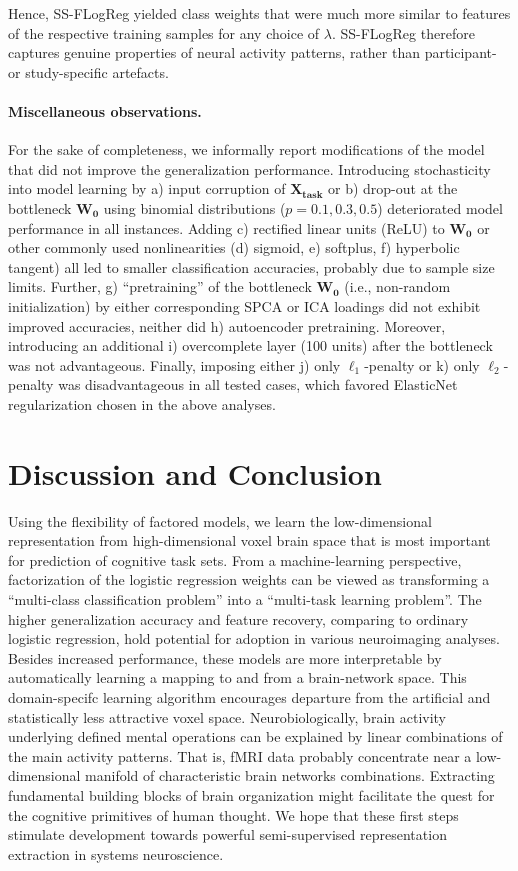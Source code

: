 \documentclass{article} %
\begin{document}
%
Hence, SS-FLogReg yielded class weights 
that were much more similar to features of the respective training samples
for any choice of $\lambda$.
SS-FLogReg therefore
captures genuine properties of neural activity patterns,
rather than participant- or study-specific artefacts.

\paragraph{Miscellaneous observations.}
For the sake of completeness,
we informally report modifications of the model
that did not improve the generalization performance.
%
Introducing stochasticity into model learning by 
a) input corruption of $\mathbf{X_{task}}$ or
b) drop-out at the bottleneck $\mathbf{W_0}$ using binomial
distributions ($p=0.1, 0.3, 0.5$) deteriorated model performance
in all instances. 
%
Adding c) rectified linear units (ReLU) to $\mathbf{W_0}$ or
other commonly used nonlinearities (d) sigmoid, e) softplus,
f) hyperbolic tangent) all led to smaller classification accuracies,
probably due to sample size limits.
%
Further, g) ``pretraining'' of the bottleneck $\mathbf{W_0}$
(i.e., non-random initialization) by 
either corresponding SPCA or ICA loadings did not exhibit improved accuracies,
neither did h) autoencoder pretraining.
%
Moreover,
introducing an additional i) overcomplete layer (100 units)
after the bottleneck was not advantageous.
%
Finally, imposing either j) only $\ell_1$-penalty or 
k) only $\ell_2$-penalty was disadvantageous in all tested cases,
which favored ElasticNet regularization chosen in the above analyses.

\section{Discussion and Conclusion}
Using the flexibility of factored models,
we learn the low-dimensional representation from high-dimensional
voxel brain space that is most important for
prediction of cognitive task sets.
%
From a machine-learning perspective,
factorization of the logistic regression weights
can be viewed as transforming a
``multi-class classification problem''
into a ``multi-task learning problem''.
%
The higher generalization accuracy and feature recovery, comparing to
ordinary logistic regression, hold potential
for adoption in various neuroimaging analyses.
Besides increased performance, these models are more interpretable by
automatically learning a mapping to and from a brain-network space.
%
This domain-specifc learning algorithm
encourages departure from the artificial and statistically
less attractive voxel space.
Neurobiologically,
brain activity underlying defined mental operations
can be explained by linear combinations of the main activity
patterns.
%
That is,
fMRI data probably concentrate near
a low-dimensional manifold of
characteristic brain networks combinations.
Extracting fundamental building blocks of brain organization might
facilitate the quest for the cognitive primitives of
human thought.
%
We hope that these first steps stimulate development towards
powerful semi-supervised representation extraction
in systems neuroscience.
\end{document}
